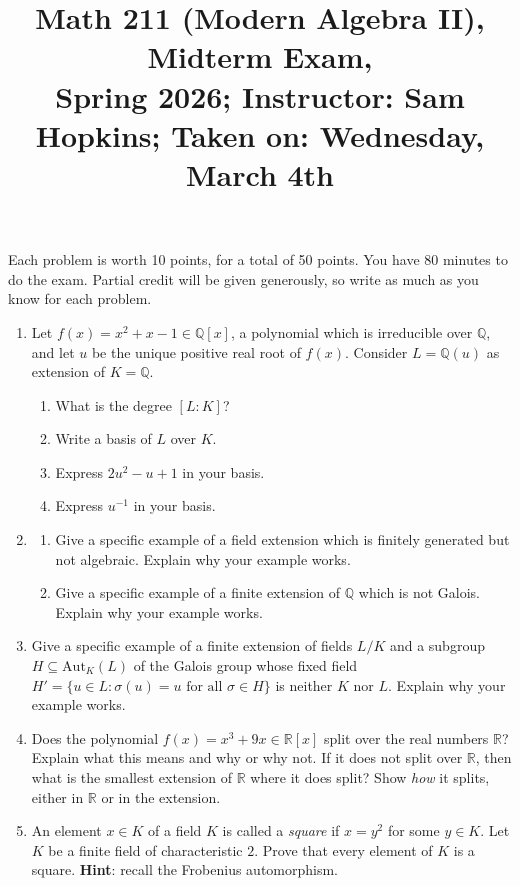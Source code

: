 \documentclass[11pt]{article}
\title{Math 211 (Modern Algebra II), Midterm Exam, \\ {\normalsize Spring 2026; Instructor: Sam Hopkins; Taken on: Wednesday, March 4th}}
\date{}
\begin{document}
\maketitle

Each problem is worth 10 points, for a total of 50 points. You have 80 minutes to do the exam. Partial credit will be given generously, so write as much as you know for each problem.

\thispagestyle{empty}
\begin{enumerate}

\item Let $f(x) = x^2 + x - 1 \in \mathbb{Q}[x]$, a polynomial which is irreducible over $\mathbb{Q}$, and let $u$ be the unique positive real root of $f(x)$. Consider $L=\mathbb{Q}(u)$ as extension of $K=\mathbb{Q}$.
\begin{enumerate}
\item What is the degree $[L:K]$? 
\item Write a basis of $L$ over $K$.
\item Express $2u^2-u+1$ in your basis.
\item Express $u^{-1}$ in your basis.
\end{enumerate}

\item \begin{enumerate}
\item Give a specific example of a field extension which is finitely generated but not algebraic. Explain why your example works.
\item Give a specific example of a finite extension of $\mathbb{Q}$ which is not Galois. Explain why your example works.
\end{enumerate}

\item Give a specific example of a finite extension of fields $L/K$ and a subgroup $H \subseteq \mathrm{Aut}_{K}(L)$ of the Galois group whose fixed field $H' = \{u \in L\colon \sigma(u) = u \textrm{ for all } \sigma \in H\}$ is neither $K$ nor $L$. Explain why your example works.

\item Does the polynomial $f(x) = x^3+9x \in \mathbb{R}[x]$ split over the real numbers $\mathbb{R}$? Explain what this means and why or why not. If it does not split over $\mathbb{R}$, then what is the smallest extension of $\mathbb{R}$ where it does split? Show \emph{how} it splits, either in $\mathbb{R}$ or in the extension.

\item An element $x\in K$ of a field $K$ is called a \emph{square} if $x=y^2$ for some $y\in K$. Let $K$ be a finite field of characteristic $2$. Prove that every element of $K$ is a square. {\bf Hint}: recall the Frobenius automorphism.

\end{enumerate}
\end{document}
